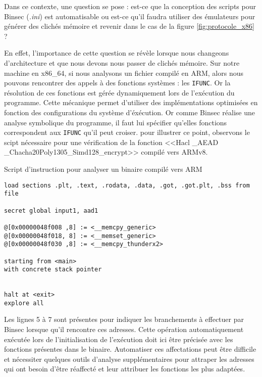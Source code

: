 Dans ce contexte, une question se pose : est-ce que la conception des scripts pour Binsec (\textit{.ini}) est automatisable ou est-ce qu'il faudra utiliser des émulateurs pour générer des clichés mémoire et revenir dans le cas de la figure \ref{fig:protocole_x86} ?\smallbreak

En effet, l'importance de cette question se révèle lorsque nous changeons d'architecture et que nous devons nous passer de clichés mémoire. Sur notre machine en x86\_64, si nous analysons un fichier compilé en ARM, alors nous pouvons rencontrer des appels à des fonctions systèmes : les \texttt{IFUNC}. Or la résolution de ces fonctions est gérée dynamiquement lors de l'exécution du programme. Cette mécanique permet d'utiliser des implémentations optimisées en fonction des configurations du système d'éxécution. Or comme Binsec réalise une analyse symbolique du programme, il faut lui spécifier qu'elles fonctions correspondent aux \texttt{IFUNC} qu'il peut croiser. pour illustrer ce point, observons le scipt nécessaire pour une vérification de la fonction <<Hacl \_AEAD \_Chacha20Poly1305\_Simd128\_encrypt>> compilé vers ARMv8.

\begin{listing}[!ht]
    \caption{Script d'instruction pour analyser un binaire compilé vers ARM}
    \label{lst:script_arm_exemple}
    \begin{verbatim}
load sections .plt, .text, .rodata, .data, .got, .got.plt, .bss from file

secret global input1, aad1

@[0x00000048f008 ,8] := <__memcpy_generic>
@[0x00000048f018, 8] := <__memset_generic>
@[0x00000048f030 ,8] := <__memcpy_thunderx2>

starting from <main>
with concrete stack pointer


halt at <exit>
explore all 
    \end{verbatim}
\end{listing}

Les lignes 5 à 7 sont présentes pour indiquer les branchements à effectuer par Binsec lorsque qu'il rencontre ces adresses. Cette opération automatiquement exécutée lors de l'initialisation de l'exécution doit ici être précisée avec les fonctions présentes dans le binaire. Automatiser ces affectations peut être difficile et nécessiter quelques outils d'analyse supplémentaires pour attraper les adresses qui ont besoin d'être réaffecté et leur attribuer les fonctions les plus adaptées.\medbreak


